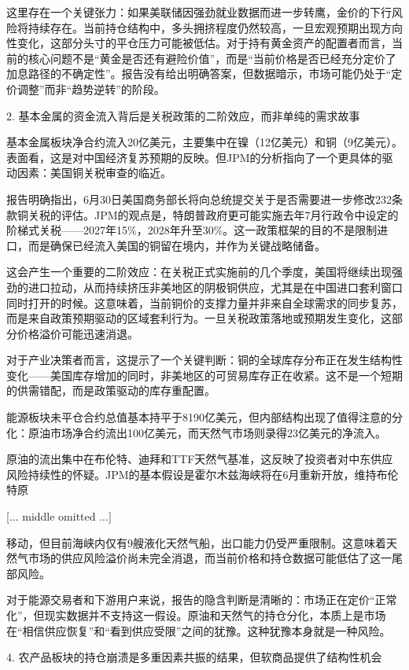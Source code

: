 \documentclass[11pt]{ctexart}
\begin{document}
这里存在一个关键张力：如果美联储因强劲就业数据而进一步转鹰，金价的下行风险将持续存在。当前持仓结构中，多头拥挤程度仍然较高，一旦宏观预期出现方向性变化，这部分头寸的平仓压力可能被低估。对于持有黄金资产的配置者而言，当前的核心问题不是“黄金是否还有避险价值”，而是“当前价格是否已经充分定价了加息路径的不确定性”。报告没有给出明确答案，但数据暗示，市场可能仍处于“定价调整”而非“趋势逆转”的阶段。

2. 基本金属的资金流入背后是关税政策的二阶效应，而非单纯的需求故事

基本金属板块净合约流入20亿美元，主要集中在镍（12亿美元）和铜（9亿美元）。表面看，这是对中国经济复苏预期的反映。但JPM的分析指向了一个更具体的驱动因素：美国铜关税审查的临近。

报告明确指出，6月30日美国商务部长将向总统提交关于是否需要进一步修改232条款铜关税的评估。JPM的观点是，特朗普政府更可能实施去年7月行政令中设定的阶梯式关税——2027年15\%，2028年升至30\%。这一政策框架的目的不是限制进口，而是确保已经流入美国的铜留在境内，并作为关键战略储备。

这会产生一个重要的二阶效应：在关税正式实施前的几个季度，美国将继续出现强劲的进口拉动，从而持续挤压非美地区的阴极铜供应，尤其是在中国进口套利窗口同时打开的时候。这意味着，当前铜价的支撑力量并非来自全球需求的同步复苏，而是来自政策预期驱动的区域套利行为。一旦关税政策落地或预期发生变化，这部分价格溢价可能迅速消退。

对于产业决策者而言，这提示了一个关键判断：铜的全球库存分布正在发生结构性变化——美国库存增加的同时，非美地区的可贸易库存正在收紧。这不是一个短期的供需错配，而是政策驱动的库存重配置。

能源板块未平仓合约总值基本持平于8190亿美元，但内部结构出现了值得注意的分化：原油市场净合约流出100亿美元，而天然气市场则录得23亿美元的净流入。

原油的流出集中在布伦特、迪拜和TTF天然气基准，这反映了投资者对中东供应风险持续性的怀疑。JPM的基本假设是霍尔木兹海峡将在6月重新开放，维持布伦特原

[... middle omitted ...]

移动，但目前海峡内仅有9艘液化天然气船，出口能力仍受严重限制。这意味着天然气市场的供应风险溢价尚未完全消退，而当前价格和持仓数据可能低估了这一尾部风险。

对于能源交易者和下游用户来说，报告的隐含判断是清晰的：市场正在定价“正常化”，但现实数据并不支持这一假设。原油和天然气的持仓分化，本质上是市场在“相信供应恢复”和“看到供应受限”之间的犹豫。这种犹豫本身就是一种风险。

4. 农产品板块的持仓崩溃是多重因素共振的结果，但软商品提供了结构性机会
\end{document}
